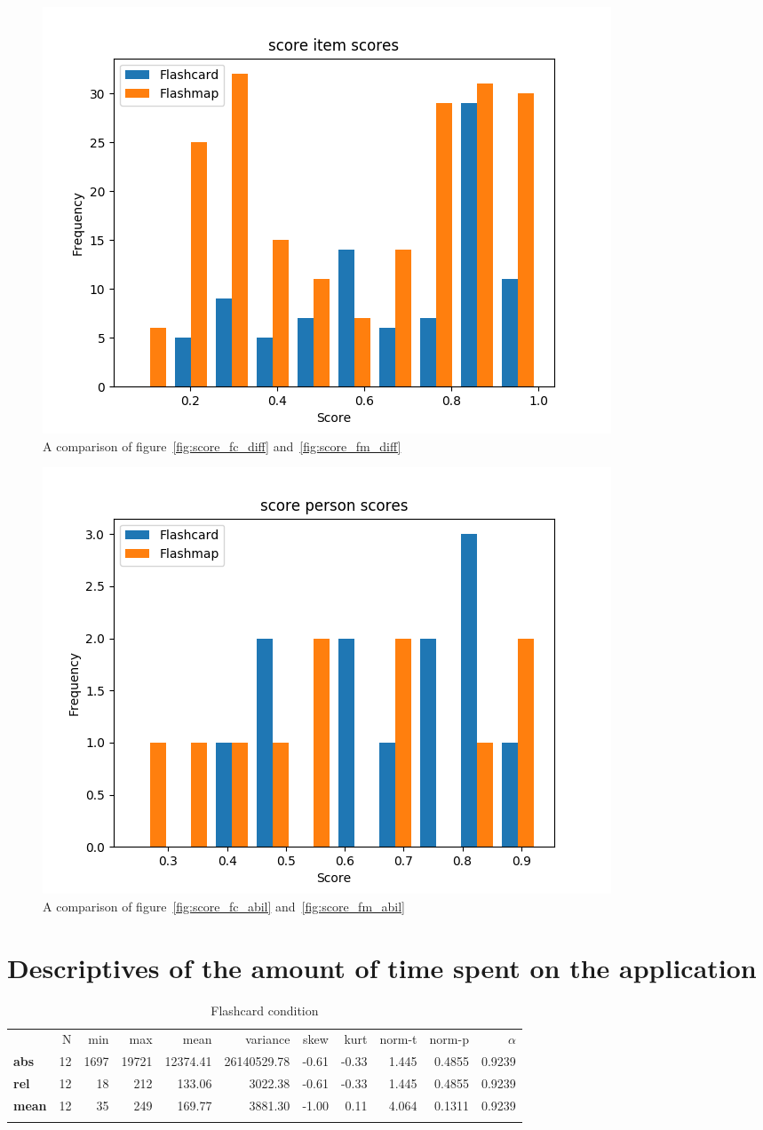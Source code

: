 \begin{figure}
    \centering
    \includegraphics[width=.7\textwidth]{img/score_diff.png}
    \caption{A comparison of figure~\protect\ref{fig:score_fc_diff} and~\protect\ref{fig:score_fm_diff}}
    \label{fig:score_diff}
\end{figure}
\begin{figure}
    \centering
    \includegraphics[width=.7\textwidth]{img/score_abil.png}
    \caption{A comparison of figure~\protect\ref{fig:score_fc_abil} and~\protect\ref{fig:score_fm_abil}}
    \label{fig:score_abil}
\end{figure}

\FloatBarrier
\section{Descriptives of the amount of time spent on the application}

\begin{longtable}[c]{@{}lrrrrrrrrrr@{}}
\caption{Flashcard condition}
\endfirsthead
\toprule\addlinespace
& N & min & max & mean & variance & skew & kurt & norm-t &
norm-p & $\alpha$
\\\addlinespace
\midrule
\textbf{abs} & 12 & 1697 & 19721 & 12374.41 & 26140529.78 & -0.61 &
-0.33 & 1.445 & 0.4855 & 0.9239
\\\addlinespace
\textbf{rel} & 12 & 18 & 212 & 133.06 & 3022.38 & -0.61 & -0.33 & 1.445
& 0.4855 & 0.9239
\\\addlinespace
\textbf{mean} & 12 & 35 & 249 & 169.77 & 3881.30 & -1.00 & 0.11 & 4.064
& 0.1311 & 0.9239
\\\addlinespace
\bottomrule
    \label{tab:time_fc}
\end{longtable}

